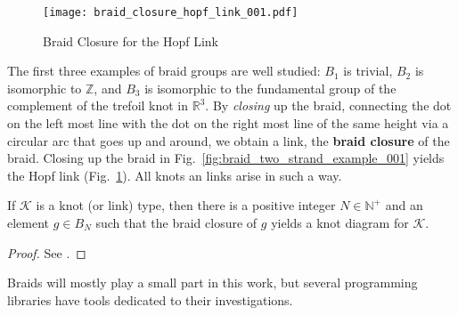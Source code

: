         \begin{figure}
            \centering
            \texttt{[image: braid\_closure\_hopf\_link\_001.pdf]}
            \caption{Braid Closure for the Hopf Link}
            \label{fig:braid_closure_hopf_link_001}
        \end{figure}
        The first three examples of braid groups are well studied:
        $B_{1}$ is trivial, $B_{2}$ is isomorphic to $\mathbb{Z}$, and
        $B_{3}$ is isomorphic to the fundamental group of the complement of
        the trefoil knot in $\mathbb{R}^{3}$. By \textit{closing} up the
        braid, connecting the dot on the left most line with the dot on the
        right most line of the same height via a circular arc that goes up and
        around, we obtain a link, the \textbf{braid closure} of the braid.
        Closing up the braid in Fig.~\ref{fig:braid_two_strand_example_001}
        yields the Hopf link (Fig.~\ref{fig:braid_closure_hopf_link_001}).
        All knots an links arise in such a way.
        \begin{theorem}
            If $\mathcal{K}$ is a knot (or link) type, then there is a
            positive integer $N\in\mathbb{N}^{+}$ and an element
            $g\in{B}_{N}$ such that the braid closure of $g$ yields a
            knot diagram for $\mathcal{K}$.
        \end{theorem}
        \begin{proof}
            See \cite{AlexandersTheorem1923}.
        \end{proof}
        Braids will mostly play a small part in this work, but
        several programming libraries have tools dedicated to their
        investigations.
